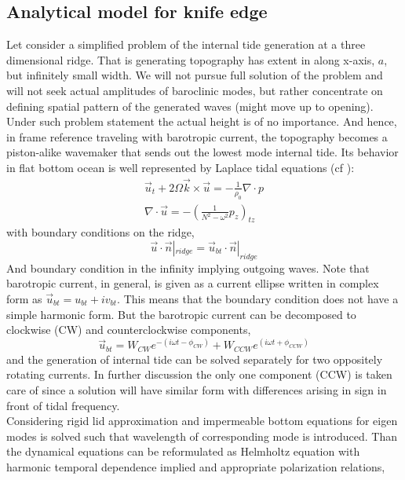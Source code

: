 \documentclass[12pt]{article}
\begin{document}
\subsection{Analytical model for knife edge}
Let consider a simplified problem of the internal tide generation at a three dimensional ridge. That is generating topography has extent in along x-axis, $a$, but infinitely small width. We will not pursue full solution of the problem and will not seek actual amplitudes of baroclinic modes, but rather concentrate on defining spatial pattern of the generated waves (might move up to opening). Under such problem statement the actual height is of no importance. And hence, in frame reference traveling with barotropic current, the topography becomes a piston-alike wavemaker that sends out the lowest mode internal tide. Its behavior in flat bottom ocean is well represented by Laplace tidal equations (cf \cite{kelly2012cascade}):
\begin{align}
\vec{u}_t + 2 \Omega \vec{k} \times \vec{u} = - \frac{1}{\rho_0} \nabla \cdot p\\
\nabla \cdot \vec{u} = -(\frac{1}{N^2 - \omega^2}p_z)_{tz}
\end{align}
with boundary conditions on the ridge,
\begin{equation}
\vec{u}\cdot \vec{n}|_{ridge} = \vec{u}_{bt} \cdot \vec{n} |_{ridge}
\end{equation}
And boundary condition in the infinity implying outgoing waves. Note that barotropic current, in general, is given as a current ellipse written in complex form as $\vec{u}_{bt} = u_{bt} + i v_{bt}$. This means that the boundary condition does not have a simple harmonic form. But the barotropic current can be decomposed to clockwise (CW) and counterclockwise components,
\begin{equation}
\vec{u}_{bt} = W_{CW} e^{-(i \omega t - \phi_{CW})} + W_{CCW} e^{(i \omega t + \phi_{CCW})}
\end{equation}
and the generation of internal tide can be solved separately for two oppositely rotating currents. In further discussion the only one component (CCW) is taken care of since a solution will have similar form with differences arising in sign in front of tidal frequency.\\
Considering rigid lid approximation and impermeable bottom equations for eigen modes is solved such that wavelength of corresponding mode is introduced. Than the dynamical equations can be reformulated as Helmholtz equation with harmonic temporal dependence implied and appropriate polarization relations,
\end{document}
